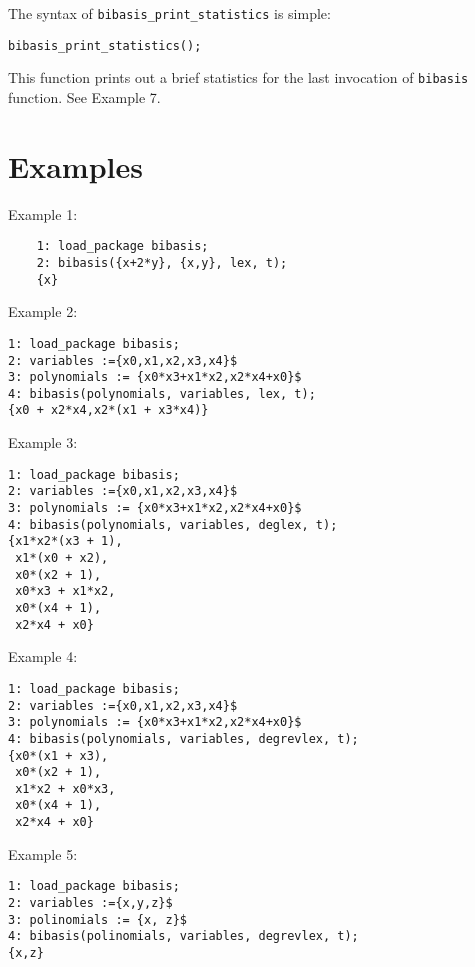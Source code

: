 \documentclass[12pt]{article}
\begin{document}
\vskip 1.0cm

\noindent The syntax of \texttt{bibasis\_print\_statistics} is simple:
\begin{center}
    \texttt{bibasis\_print\_statistics();}
\end{center}
This function prints out a brief statistics for the last invocation of \texttt{bibasis} function. See Example 7.

\section{Examples}


Example 1:
\begin{verbatim}
    1: load_package bibasis;
    2: bibasis({x+2*y}, {x,y}, lex, t);
    {x}

\end{verbatim}

\noindent Example 2:
\begin{verbatim}
1: load_package bibasis;
2: variables :={x0,x1,x2,x3,x4}$
3: polynomials := {x0*x3+x1*x2,x2*x4+x0}$
4: bibasis(polynomials, variables, lex, t);
{x0 + x2*x4,x2*(x1 + x3*x4)}

\end{verbatim}

\noindent Example 3:
\begin{verbatim}
1: load_package bibasis;
2: variables :={x0,x1,x2,x3,x4}$
3: polynomials := {x0*x3+x1*x2,x2*x4+x0}$
4: bibasis(polynomials, variables, deglex, t);
{x1*x2*(x3 + 1),
 x1*(x0 + x2),
 x0*(x2 + 1),
 x0*x3 + x1*x2,
 x0*(x4 + 1),
 x2*x4 + x0}

\end{verbatim}

\noindent Example 4:
\begin{verbatim}
1: load_package bibasis;
2: variables :={x0,x1,x2,x3,x4}$
3: polynomials := {x0*x3+x1*x2,x2*x4+x0}$
4: bibasis(polynomials, variables, degrevlex, t);
{x0*(x1 + x3),
 x0*(x2 + 1),
 x1*x2 + x0*x3,
 x0*(x4 + 1),
 x2*x4 + x0}

\end{verbatim}

\newpage

\noindent Example 5:
\begin{verbatim}
1: load_package bibasis;
2: variables :={x,y,z}$
3: polinomials := {x, z}$
4: bibasis(polinomials, variables, degrevlex, t);
{x,z}

\end{verbatim}
\end{document}
